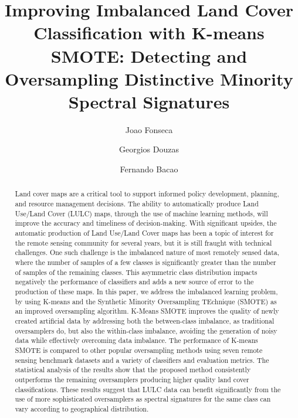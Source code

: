 \documentclass[authoryear,preprint,12pt]{elsarticle}
\date{}
\begin{document}
\begin{frontmatter}

\title{Improving Imbalanced Land Cover Classification with K-means SMOTE:
Detecting and Oversampling Distinctive Minority Spectral Signatures}


\author[inst1]{Joao Fonseca} 
\author[inst1]{Georgios Douzas}
\author[inst1]{Fernando Bacao}


\begin{abstract}
    \begin{linenumbers}
    Land cover maps are a critical tool to support informed policy
    development, planning, and resource management decisions. The ability to
    automatically produce Land Use/Land Cover (LULC) maps, through the use of
    machine learning methods, will improve the accuracy and timeliness of
    decision-making. With significant upsides, the automatic production of
    Land Use/Land Cover maps has been a topic of interest for the remote
    sensing community for several years, but it is still fraught with
    technical challenges. One such challenge is the imbalanced nature of most
    remotely sensed data, where the number of samples of a few classes is
    significantly greater than the number of samples of the remaining classes.
    This asymmetric class distribution impacts negatively the performance of
    classifiers and adds a new source of error to the production of these
    maps. In this paper, we address the imbalanced learning problem, by using
    K-means and the Synthetic Minority Oversampling TEchnique (SMOTE) as an
    improved oversampling algorithm. K-Means SMOTE improves the quality of
    newly created artificial data by addressing both the between-class
    imbalance, as traditional oversamplers do, but also the within-class
    imbalance, avoiding the generation of noisy data while effectively
    overcoming data imbalance. The performance of K-means SMOTE is compared to
    other popular oversampling methods using seven remote sensing benchmark
    datasets and a variety of classifiers and evaluation metrics. The
    statistical analysis of the results show that the proposed method
    consistently outperforms the remaining oversamplers producing higher
    quality land cover classifications. These results suggest that LULC data
    can benefit significantly from the use of more sophisticated oversamplers
    as spectral signatures for the same class can vary according to
    geographical distribution.
    \end{linenumbers}
\end{abstract}



\end{frontmatter}
\end{document}
